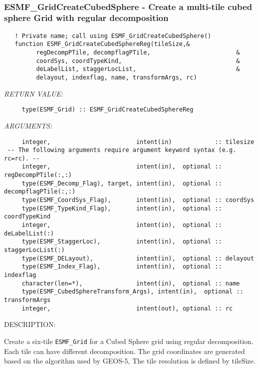  
\mbox{}\hrulefill\ 
 
\subsubsection [ESMF\_GridCreateCubedSphere] {ESMF\_GridCreateCubedSphere - Create a multi-tile cubed sphere Grid with regular decomposition}


 
\begin{verbatim}   ! Private name; call using ESMF_GridCreateCubedSphere()
   function ESMF_GridCreateCubedSphereReg(tileSize,&
         regDecompPTile, decompflagPTile,                        &
         coordSys, coordTypeKind,                                &
         deLabelList, staggerLocList,                            &
         delayout, indexflag, name, transformArgs, rc)\end{verbatim}{\em RETURN VALUE:}
\begin{verbatim}     type(ESMF_Grid) :: ESMF_GridCreateCubedSphereReg\end{verbatim}{\em ARGUMENTS:}
\begin{verbatim}     integer,                        intent(in)            :: tilesize
 -- The following arguments require argument keyword syntax (e.g. rc=rc). --
     integer,                        intent(in),  optional :: regDecompPTile(:,:)
     type(ESMF_Decomp_Flag), target, intent(in),  optional :: decompflagPTile(:,:)
     type(ESMF_CoordSys_Flag),       intent(in),  optional :: coordSys
     type(ESMF_TypeKind_Flag),       intent(in),  optional :: coordTypeKind
     integer,                        intent(in),  optional :: deLabelList(:)
     type(ESMF_StaggerLoc),          intent(in),  optional :: staggerLocList(:)
     type(ESMF_DELayout),            intent(in),  optional :: delayout
     type(ESMF_Index_Flag),          intent(in),  optional :: indexflag
     character(len=*),               intent(in),  optional :: name
     type(ESMF_CubedSphereTransform_Args), intent(in),  optional :: transformArgs
     integer,                        intent(out), optional :: rc
 \end{verbatim}
{\sf DESCRIPTION:\\ }


     Create a six-tile {\tt ESMF\_Grid} for a Cubed Sphere grid using regular decomposition.  Each tile can
     have different decomposition.  The grid coordinates are generated based on the algorithm used by GEOS-5,
     The tile resolution is defined by tileSize.
  
